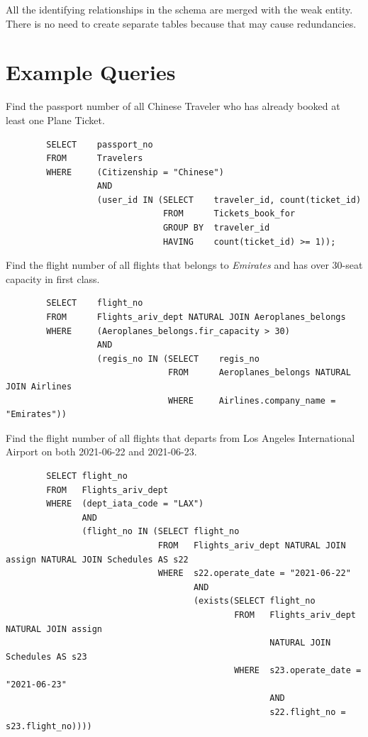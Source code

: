 \documentclass{article}
\begin{document}
	All the identifying relationships in the schema are merged with the weak entity. There is no need to create separate tables because that may cause redundancies.
	
	\section{Example Queries}
	
	\noindent Find the passport number of all Chinese Traveler who has already booked at least one Plane Ticket. 
	\begin{verbatim}
		SELECT    passport_no 
		FROM      Travelers
		WHERE     (Citizenship = "Chinese") 
		          AND 
		          (user_id IN (SELECT    traveler_id, count(ticket_id)
		                       FROM      Tickets_book_for
		                       GROUP BY  traveler_id
		                       HAVING    count(ticket_id) >= 1));
	\end{verbatim}
    
	\noindent Find the flight number of all flights that belongs to \textit{Emirates} and has over 30-seat capacity in first class. 
	\begin{verbatim}
		SELECT    flight_no
		FROM      Flights_ariv_dept NATURAL JOIN Aeroplanes_belongs
		WHERE     (Aeroplanes_belongs.fir_capacity > 30) 
		          AND
		          (regis_no IN (SELECT    regis_no
		                        FROM      Aeroplanes_belongs NATURAL JOIN Airlines
		                        WHERE     Airlines.company_name = "Emirates"))               
	\end{verbatim}
	
	\noindent Find the flight number of all flights that departs from Los Angeles International Airport on both 2021-06-22 and 2021-06-23.
	\begin{verbatim}
		SELECT flight_no
		FROM   Flights_ariv_dept
		WHERE  (dept_iata_code = "LAX")
		       AND 
		       (flight_no IN (SELECT flight_no
		                      FROM   Flights_ariv_dept NATURAL JOIN assign NATURAL JOIN Schedules AS s22
		                      WHERE  s22.operate_date = "2021-06-22"
		                             AND
		                             (exists(SELECT flight_no
		                                     FROM   Flights_ariv_dept NATURAL JOIN assign 
		                                            NATURAL JOIN Schedules AS s23
		                                     WHERE  s23.operate_date = "2021-06-23"
		                                            AND
		                                            s22.flight_no = s23.flight_no))))     
	\end{verbatim}
	
\end{document}
